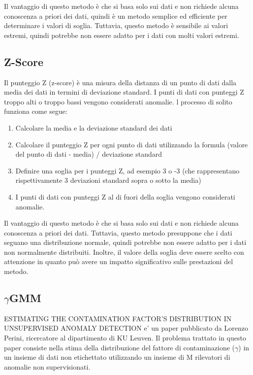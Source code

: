 Il vantaggio di questo metodo è che si basa solo sui dati e non richiede alcuna conoscenza a priori dei dati, quindi è un metodo semplice ed efficiente per determinare i valori di soglia. Tuttavia, questo metodo è sensibile ai valori estremi, quindi potrebbe non essere adatto per i dati con molti valori estremi.

\subsection{Z-Score}
Il punteggio Z (z-score) è una misura della distanza di un punto di dati dalla media dei dati in termini di deviazione standard. I punti di dati con punteggi Z troppo alti o troppo bassi vengono considerati anomalie.
l processo di solito funziona come segue:
\begin{enumerate}
\item Calcolare la media e la deviazione standard dei dati
\item Calcolare il punteggio Z per ogni punto di dati utilizzando la formula (valore del punto di dati - media) / deviazione standard
\item Definire una soglia per i punteggi Z, ad esempio 3 o -3 (che rappresentano rispettivamente 3 deviazioni standard sopra o sotto la media)
\item I punti di dati con punteggi Z al di fuori della soglia vengono considerati anomalie.
\end{enumerate}
Il vantaggio di questo metodo è che si basa solo sui dati e non richiede alcuna conoscenza a priori dei dati. Tuttavia, questo metodo presuppone che i dati seguano una distribuzione normale, quindi potrebbe non essere adatto per i dati non normalmente distribuiti. Inoltre, il valore della soglia deve essere scelto con attenzione in quanto può avere un impatto significativo sulle prestazioni del metodo.


\subsection{$\gamma$GMM}
ESTIMATING THE CONTAMINATION FACTOR’S DISTRIBUTION IN UNSUPERVISED ANOMALY DETECTION e' un paper pubblicato da Lorenzo Perini, ricercatore al dipartimento di KU Leuven.
Il problema trattato in questo paper consiste nella stima della distribuzione del fattore di contaminazione ($\gamma$) in un insieme di dati non etichettato utilizzando un insieme di M rilevatori di anomalie non supervisionati. 

